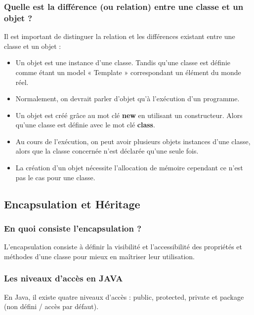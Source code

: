 \documentclass[11pt,twoside,a4paper]{article}
\begin{document}
\begin{landscape}
\begin{multicols}{2}
\subsubsection*{Quelle est la diff{\'e}rence (ou relation) entre une classe et un objet ?}

Il est important de distinguer la relation et les diff{\'e}rences existant entre une classe et un objet :
\begin{itemize}
	\item Un objet est une instance d'une classe. Tandis qu'une classe est d{\'e}finie comme {\'e}tant un model « Template » correspondant un {\'e}l{\'e}ment du monde r{\'e}el.
	\item Normalement, on devrait parler d'objet qu'{\`a} l'ex{\'e}cution d'un programme.
	\item Un objet est cr{\'e}{\'e} gr{\^a}ce au mot cl{\'e} \textbf{new} en utilisant un constructeur. Alors qu'une classe est d{\'e}finie avec le mot cl{\'e} \textbf{class}.
	\item Au cours de l'ex{\'e}cution, on peut avoir plusieurs objets instances d'une classe, alors que la classe concern{\'e}e n'est d{\'e}clar{\'e}e qu'une seule fois.
	\item La cr{\'e}ation d'un objet n{\'e}cessite l'allocation de m{\'e}moire cependant ce n'est pas le cas pour une classe.
\end{itemize}

\subsection*{Encapsulation et H{\'e}ritage}

\subsubsection*{En quoi consiste l'encapsulation ?}

L'encapsulation consiste {\`a} d{\'e}finir la visibilit{\'e} et l'accessibilit{\'e} des propri{\'e}t{\'e}s et m{\'e}thodes d'une classe pour mieux en ma{\^i}triser leur utilisation.

\subsubsection*{Les niveaux d'acc{\`e}s en JAVA}

En Java, il existe quatre niveaux d'acc{\`e}s : public, protected, private et package (non d{\'e}fini / acc{\`e}s par d{\'e}faut).


\end{multicols}
\end{landscape}
\end{document}
